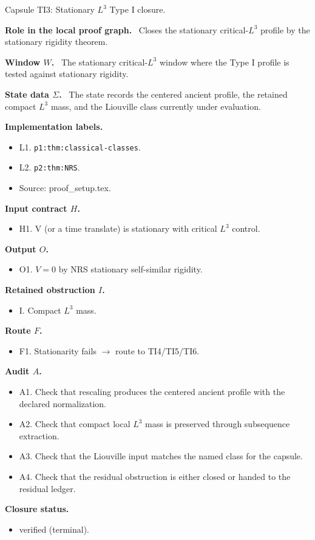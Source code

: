 \documentclass[11pt]{amsart}
\newcommand{\capsulefield}[1]{\par\smallskip\noindent\textbf{#1.}\ }
\begin{document}
\begin{proofcapsule}{Capsule TI3: Stationary $L^3$ Type I closure.}
  \capsulefield{Role in the local proof graph}
  Closes the stationary critical-\(L^3\) profile by the stationary rigidity theorem.

  \capsulefield{Window \(W\)}
The stationary critical-$L^3$ window where the Type I profile is tested against stationary rigidity.

  \capsulefield{State data \(\Sigma\)}
The state records the centered ancient profile, the retained compact $L^3$ mass, and the Liouville class currently under evaluation.

  \capsulefield{Implementation labels}
  \begin{itemize}[leftmargin=1.8em]
  \item L1. \texttt{p1:thm:classical-classes}.
  \item L2. \texttt{p2:thm:NRS}.
  \item Source: proof\_setup.tex.
  \end{itemize}

  \capsulefield{Input contract \(H\)}
  \begin{itemize}[leftmargin=1.8em]
  \item H1. V (or a time translate) is stationary with critical $L^3$ control.
  \end{itemize}

  \capsulefield{Output \(O\)}
  \begin{itemize}[leftmargin=1.8em]
  \item O1. \(V=0\) by NRS stationary self-similar rigidity.
  \end{itemize}

  \capsulefield{Retained obstruction \(I\)}
  \begin{itemize}[leftmargin=1.8em]
  \item I. Compact $L^3$ mass.
  \end{itemize}

  \capsulefield{Route \(F\)}
  \begin{itemize}[leftmargin=1.8em]
  \item F1. Stationarity fails $\to$ route to TI4/TI5/TI6.
  \end{itemize}

  \capsulefield{Audit \(A\)}
  \begin{itemize}[leftmargin=1.8em]
  \item A1. Check that rescaling produces the centered ancient profile with the declared normalization.
  \item A2. Check that compact local $L^3$ mass is preserved through subsequence extraction.
  \item A3. Check that the Liouville input matches the named class for the capsule.
  \item A4. Check that the residual obstruction is either closed or handed to the residual ledger.
  \end{itemize}
  \capsulefield{Closure status}
  \begin{itemize}[leftmargin=1.8em]
  \item verified (terminal).
  \end{itemize}
\end{proofcapsule}
\end{document}
